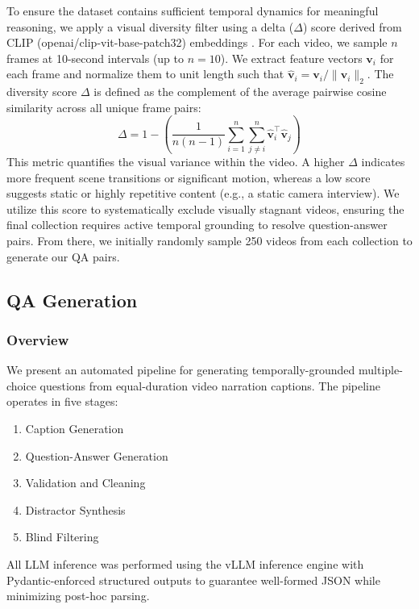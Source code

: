 \documentclass[sigconf,natbib=false,nonacm]{acmart}
\begin{document}
To ensure the dataset contains sufficient temporal dynamics for meaningful reasoning, we apply a visual diversity filter using a delta ($\Delta$) score derived from CLIP (openai/clip-vit-base-patch32) embeddings \cite{clip}. For each video, we sample $n$ frames at 10-second intervals (up to $n=10$). We extract feature vectors $\mathbf{v}_i$ for each frame and normalize them to unit length such that $\mathbf{\hat{v}}_i = \mathbf{v}_i / \|\mathbf{v}_i\|_2$. The diversity score $\Delta$ is defined as the complement of the average pairwise cosine similarity across all unique frame pairs:$$\Delta = 1 - \left( \frac{1}{n(n - 1)} \sum_{i=1}^{n} \sum_{j \neq i}^{n} \mathbf{\hat{v}}_i^\top \mathbf{\hat{v}}_j \right)$$
This metric quantifies the visual variance within the video. A higher $\Delta$ indicates more frequent scene transitions or significant motion, whereas a low score suggests static or highly repetitive content (e.g., a static camera interview). We utilize this score to systematically exclude visually stagnant videos, ensuring the final collection requires active temporal grounding to resolve question-answer pairs. From there, we initially randomly sample 250 videos from each collection to generate our QA pairs.


\subsection{QA Generation}

\subsubsection{Overview}

We present an automated pipeline for generating temporally-grounded multiple-choice questions from equal-duration video narration captions. The pipeline operates in five stages:
\begin{enumerate} 
  \item Caption Generation
  \item Question-Answer Generation
  \item Validation and Cleaning
  \item Distractor Synthesis
  \item Blind Filtering
\end{enumerate}

All LLM inference was performed using the vLLM inference engine with Pydantic-enforced \cite{pydantic} structured outputs to guarantee well-formed JSON while minimizing post-hoc parsing.
\end{document}
